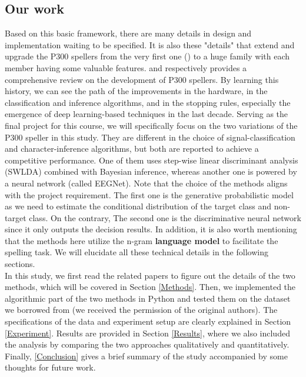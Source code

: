 \documentclass{article}
\begin{document}
\subsection{Our work} \label{Work}
Based on this basic framework, there are many details in design and implementation waiting to be specified. It is also these "details" that extend and upgrade the P300 spellers from the very first one (\cite{farwell1988talking}) to a huge family with each member having some valuable features. \cite{elshout2009review} and \cite{fang2021recent} respectively provides a comprehensive review on the development of P300 spellers. By learning this history, we can see the path of the improvements in the hardware, in the classification and inference algorithms, and in the stopping rules, especially the emergence of deep learning-based techniques in the last decade. Serving as the final project for this course, we will specifically focus on the two variations of the P300 speller in this study. They are different in the choice of signal-classification and character-inference algorithms, but both are reported to achieve a competitive performance. One of them uses step-wise linear discriminant analysis (SWLDA) combined with Bayesian inference, whereas another one is powered by a neural network (called EEGNet). Note that the choice of the methods aligns with the project requirement. The first one is the generative probabilistic model as we need to estimate the conditional distribution of the target class and non-target class. On the contrary, The second one is the discriminative neural network since it only outputs the decision results. In addition, it is also worth mentioning that the methods here utilize the n-gram \textbf{language model} to facilitate the spelling task. We will elucidate all these technical details in the following sections.\\

\vspace{-3mm}
In this study, we first read the related papers to figure out the details of the two methods, which will be covered in Section \ref{Methods}. Then, we implemented the algorithmic part of the two methods in Python and tested them on the dataset we borrowed from \cite{mainsah2014utilizing} (we received the permission of the original authors). The specifications of the data and experiment setup are clearly explained in Section \ref{Experiment}. Results are provided in Section \ref{Results}, where we also included the analysis by comparing the two approaches qualitatively and quantitatively. Finally, \ref{Conclusion} gives a brief summary of the study accompanied by some thoughts for future work.
\end{document}
